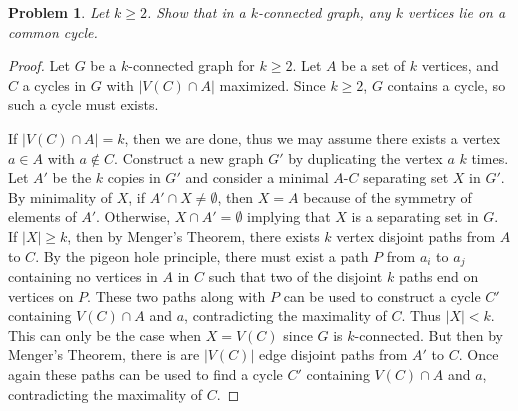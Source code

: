 \documentclass[12pt]{article}
\newtheorem{problem}{Problem}
\begin{document}
\begin{problem} Let $k \geq 2$. Show that in a $k$-connected graph,
  any $k$ vertices lie on a common cycle.
\end{problem}
\begin{proof} Let $G$ be a $k$-connected graph for $k \geq 2$. Let $A$
  be a set of $k$ vertices, and $C$ a cycles in $G$ with
  $|V(C) \cap A|$ maximized. Since $k \geq 2$, $G$ contains a cycle,
  so such a cycle must exists.

  If $|V(C) \cap A| = k$, then we are done, thus we may assume there
  exists a vertex $a \in A$ with $a \notin C$. Construct a new graph
  $G'$ by duplicating the vertex $a$ $k$ times. Let $A'$ be the $k$
  copies in $G'$ and consider a minimal $A$-$C$ separating set $X$ in
  $G'$. By minimality of $X$, if $A' \cap X \neq \emptyset$, then
  $X = A$ because of the symmetry of elements of $A'$. Otherwise,
  $X \cap A' = \emptyset$ implying that $X$ is a separating set in
  $G$. If $|X| \geq k$, then by Menger's Theorem, there exists $k$
  vertex disjoint paths from $A$ to $C$. By the pigeon hole principle,
  there must exist a path $P$ from $a_i$ to $a_j$ containing no
  vertices in $A$ in $C$ such that two of the disjoint $k$ paths end
  on vertices on $P$. These two paths along with $P$ can be used to
  construct a cycle $C'$ containing $V(C) \cap A$ and $a$,
  contradicting the maximality of $C$. Thus $|X| < k$. This can only
  be the case when $X = V(C)$ since $G$ is $k$-connected. But then by
  Menger's Theorem, there is are $|V(C)|$ edge disjoint paths from
  $A'$ to $C$. Once again these paths can be used to find a cycle $C'$
  containing $V(C) \cap A$ and $a$, contradicting the maximality of
  $C$.
\end{proof}
\end{document}
